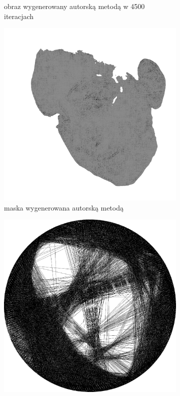 \documentclass[a4paper, 12pt, polish, twoside]{extreport}
\begin{document}
\begin{figure}[H]
\begin{subfigure}{0.24\textwidth}
        \caption{obraz wygenerowany autorską metodą w 4500 iteracjach}
        \label{comp-comp-magdalene-g}
    \end{subfigure}
    \begin{subfigure}{0.24\textwidth}
        \centering
        \includegraphics[width = \textwidth]{img/6-comp/magdalene_mask_c20_inv0_bg1_obj10_ed10.png}
        \caption{maska wygenerowana autorską metodą}
        \label{comp-comp-magdalene-h}
    \end{subfigure}
    \begin{subfigure}{0.24\textwidth}
        \centering
        \includegraphics[width = \textwidth]{img/6-comp/magdalene_e_i3500_c20_inv0_bg1_obj2_ed1.png}

\end{subfigure}
\end{figure}
\end{document}
